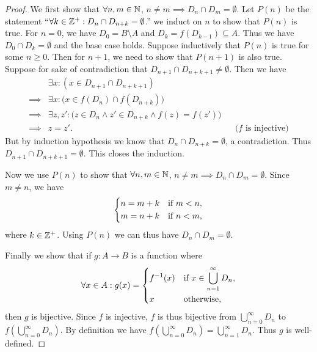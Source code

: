 \begin{proof}
  We first show that \(\forall n, m \in \mathbb{N}\), \(n \neq m \implies D_n \cap D_m = \emptyset\).
  Let \(P(n)\) be the statement ``\(\forall k \in \mathbb{Z}^+ : D_n \cap D_{n + k} = \emptyset\).''
  we induct on \(n\) to show that \(P(n)\) is true.
  For \(n = 0\), we have \(D_0 = B \setminus A\) and \(D_k = f(D_{k - 1}) \subseteq A\).
  Thus we have \(D_0 \cap D_k = \emptyset\) and the base case holds.
  Suppose inductively that \(P(n)\) is true for some \(n \geq 0\).
  Then for \(n + 1\), we need to show that \(P(n + 1)\) is also true.
  Suppose for sake of contradiction that \(D_{n + 1} \cap D_{n + k + 1} \neq \emptyset\).
  Then we have
  \begin{align*}
             & \exists x : (x \in D_{n + 1} \cap D_{n + k + 1})                                                               \\
    \implies & \exists x : \big(x \in f(D_n) \cap f(D_{n + k})\big)                                                           \\
    \implies & \exists z, z' : \big(z \in D_n \land z' \in D_{n + k} \land f(z) = f(z')\big)                                  \\
    \implies & z = z'.                                                                       &  & \text{(\(f\) is injective)}
  \end{align*}
  But by induction hypothesis we know that \(D_n \cap D_{n + k} = \emptyset\), a contradiction.
  Thus \(D_{n + 1} \cap D_{n + k + 1} = \emptyset\).
  This closes the induction.

  Now we use \(P(n)\) to show that \(\forall n, m \in \mathbb{N}\), \(n \neq m \implies D_n \cap D_m = \emptyset\).
  Since \(m \neq n\), we have
  \[
    \begin{dcases}
      n = m + k & \text{if } m < n, \\
      m = n + k & \text{if } n < m,
    \end{dcases}
  \]
  where \(k \in \mathbb{Z}^+\).
  Using \(P(n)\) we can thus have \(D_n \cap D_m = \emptyset\).

  Finally we show that if \(g : A \to B\) is a function where
  \[
    \forall x \in A : g(x) = \begin{dcases}
      f^{-1}(x) & \text{if } x \in \bigcup_{n = 1}^\infty D_n, \\
      x         & \text{otherwise},
    \end{dcases}
  \]
  then \(g\) is bijective.
  Since \(f\) is injective, \(f\) is thus bijective from \(\bigcup_{n = 0}^\infty D_n\) to \(f(\bigcup_{n = 0}^\infty D_n)\).
  By definition we have \(f(\bigcup_{n = 0}^\infty D_n) = \bigcup_{n = 1}^\infty D_n\).
  Thus \(g\) is well-defined.


\end{proof}
